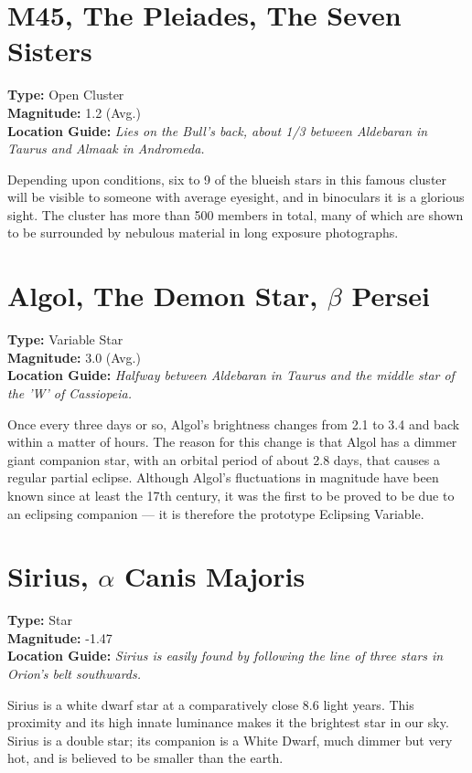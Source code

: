 \section{M45, The Pleiades, The Seven Sisters}
\textbf{Type:} Open Cluster \\
\textbf{Magnitude:} 1.2 (Avg.) \\
\textbf{Location Guide:} \textit{Lies on the Bull's back, about 1/3 between Aldebaran in Taurus and Almaak in Andromeda.} 

Depending upon conditions, six to 9 of the blueish stars in this
famous cluster will be visible to someone with average eyesight, and in
binoculars it is a glorious sight. The cluster has more than 500
members in total, many of which are shown to be surrounded by nebulous
material in long exposure photographs.

\section{Algol, The Demon Star, \texorpdfstring{$\beta$}{beta} Persei}
\textbf{Type:} Variable Star \\
\textbf{Magnitude:} 3.0 (Avg.) \\
\textbf{Location Guide:} \textit{Halfway between Aldebaran in Taurus and the middle star of the 'W' of Cassiopeia.}

Once every three days or so, Algol's brightness changes from 2.1 to 3.4
and back within a matter of hours. The reason for this change is that
Algol has a dimmer giant companion star, with an orbital period of
about 2.8 days, that causes a regular partial eclipse. Although
Algol's fluctuations in magnitude have been known since at least the
17th century, it was the first to be proved to be due to an eclipsing
companion --- it is therefore the prototype Eclipsing Variable.

\section{Sirius, \texorpdfstring{$\alpha$}{alpha} Canis Majoris}
\textbf{Type:} Star \\
\textbf{Magnitude:} -1.47 \\
\textbf{Location Guide:} \textit{Sirius is easily found by following the line of three stars in Orion's belt southwards.} 

Sirius is a white dwarf star at a comparatively close 8.6 light
years. This proximity and its high innate luminance makes it the
brightest star in our sky. Sirius is a double star; its companion is a White Dwarf, 
much dimmer but very hot, and is believed to be smaller than the earth.


